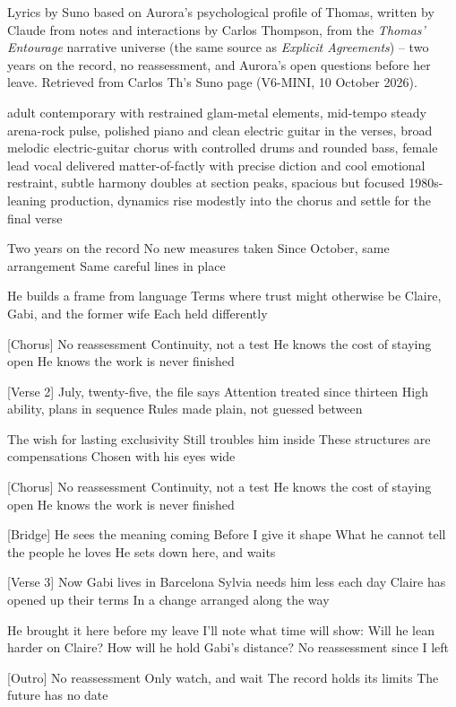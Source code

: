 \begin{notes}
Lyrics by Suno based on Aurora's psychological profile of Thomas, written by Claude from notes and interactions by Carlos Thompson, from the \emph{Thomas' Entourage} narrative universe (the same source as \emph{Explicit Agreements}) -- two years on the record, no reassessment, and Aurora's open questions before her leave. Retrieved from Carlos Th's Suno page (V6-MINI, 10 October 2026).
\end{notes}
\begin{style}
adult contemporary with restrained glam-metal elements, mid-tempo steady arena-rock pulse, polished piano and clean electric guitar in the verses, broad melodic electric-guitar chorus with controlled drums and rounded bass, female lead vocal delivered matter-of-factly with precise diction and cool emotional restraint, subtle harmony doubles at section peaks, spacious but focused 1980s-leaning production, dynamics rise modestly into the chorus and settle for the final verse
\end{style}
\begin{lyrics}
[Verse 1]
Two years on the record
No new measures taken
Since October, same arrangement
Same careful lines in place

He builds a frame from language
Terms where trust might otherwise be
Claire, Gabi, and the former wife
Each held differently

[Chorus]
No reassessment
Continuity, not a test
He knows the cost of staying open
He knows the work is never finished

[Verse 2]
July, twenty-five, the file says
Attention treated since thirteen
High ability, plans in sequence
Rules made plain, not guessed between

The wish for lasting exclusivity
Still troubles him inside
These structures are compensations
Chosen with his eyes wide

[Chorus]
No reassessment
Continuity, not a test
He knows the cost of staying open
He knows the work is never finished

[Bridge]
He sees the meaning coming
Before I give it shape
What he cannot tell the people he loves
He sets down here, and waits

[Verse 3]
Now Gabi lives in Barcelona
Sylvia needs him less each day
Claire has opened up their terms
In a change arranged along the way

He brought it here before my leave
I’ll note what time will show:
Will he lean harder on Claire?
How will he hold Gabi’s distance?
No reassessment since I left

[Outro]
No reassessment
Only watch, and wait
The record holds its limits
The future has no date
\end{lyrics}

